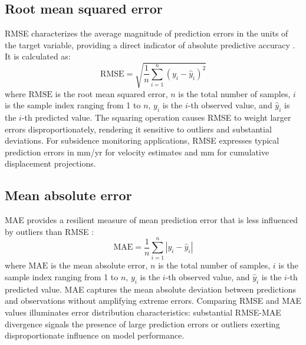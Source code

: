 \documentclass[oneside,doublespacing,flushright]{lsuthesis}
\begin{document}
\subsection{Root mean squared error}
RMSE characterizes the average magnitude of prediction errors in the units of the target variable, providing a direct indicator of absolute predictive accuracy \citep{Chai2014}. It is calculated as:
\begin{equation}
\text{RMSE} = \sqrt{\frac{1}{n}\sum_{i=1}^{n}(y_i - \hat{y}_i)^2}
\end{equation}
where $\text{RMSE}$ is the root mean squared error, $n$ is the total number of samples, $i$ is the sample index ranging from 1 to $n$, $y_i$ is the $i$-th observed value, and $\hat{y}_i$ is the $i$-th predicted value. The squaring operation causes RMSE to weight larger errors disproportionately, rendering it sensitive to outliers and substantial deviations. For subsidence monitoring applications, RMSE expresses typical prediction errors in mm/yr for velocity estimates and mm for cumulative displacement projections.

\subsection{Mean absolute error}
MAE provides a resilient measure of mean prediction error that is less influenced by outliers than RMSE \citep{Willmott2005}:
\begin{equation}
\text{MAE} = \frac{1}{n}\sum_{i=1}^{n}|y_i - \hat{y}_i|
\end{equation}
where $\text{MAE}$ is the mean absolute error, $n$ is the total number of samples, $i$ is the sample index ranging from 1 to $n$, $y_i$ is the $i$-th observed value, and $\hat{y}_i$ is the $i$-th predicted value. MAE captures the mean absolute deviation between predictions and observations without amplifying extreme errors. Comparing RMSE and MAE values illuminates error distribution characteristics: substantial RMSE-MAE divergence signals the presence of large prediction errors or outliers exerting disproportionate influence on model performance.
\end{document}
